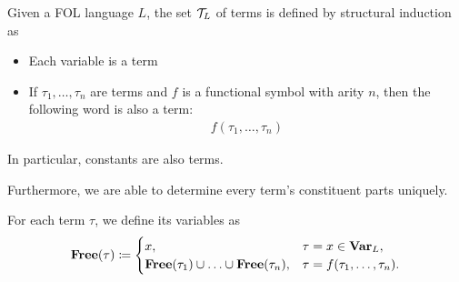 \begin{definition}\label{def:first_order_term}\cite[definition 2.2]{Nerode2012}
  Given a FOL language $L$, the set $\mathcal T_L$ of terms is defined by structural induction as
  \begin{itemize}
    \item Each variable is a term
    \item If $\tau_1, \ldots, \tau_n$ are terms and $f$ is a functional symbol with arity $n$, then the following word is also a term:
    \begin{align*}
      f(\tau_1, \ldots, \tau_n)
    \end{align*}
  \end{itemize}

  In particular, constants are also terms.

  Furthermore, we are able to determine every term's constituent parts uniquely.

  For each term $\tau$, we define its variables as
  \begin{align*}
    \operatorname{\mathbf{Free}}(\tau) \coloneqq \begin{cases}
      x,                                                        &\tau = x \in \operatorname{\mathbf{Var}}_L, \\
      \operatorname{\mathbf{Free}}(\tau_1) \cup \ldots \cup \operatorname{\mathbf{Free}}(\tau_n), &\tau = f(\tau_1, \ldots, \tau_n).
    \end{cases}
  \end{align*}
\end{definition}

